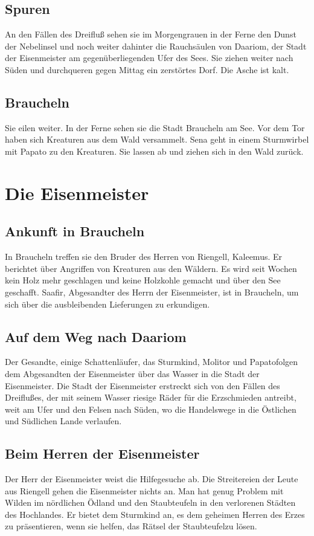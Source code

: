 \documentclass[12pt,a4paper,onecolumn,oneside,ngerman]{book}
\newcommand{\Molitor}{Molitor}
\newcommand{\Sena}{Sena}
\newcommand{\Sturmkind}{Sturmkind}
\newcommand{\Papato}{Papato}
\newcommand{\Schattenlaufer}{Schattenläufer}
\newcommand{\Rhingell}{Riengell}
\newcommand{\Kalemus}{Kaleemus}
\newcommand{\Dreifluss}{Dreifluß}
\newcommand{\Braucheln}{Braucheln}
\newcommand{\Eisenmeister}{Eisenmeister}
\newcommand{\Dariom}{Daariom}
\newcommand{\Safir}{Saafir}
\newcommand{\Staubteufel}{Staubteufel}
\begin{document}
\chapter{Spuren}
An den Fällen des {\Dreifluss} sehen sie im Morgengrauen in der Ferne den Dunst der Nebelinsel und noch weiter dahinter die Rauchsäulen von {\Dariom}, der Stadt der {\Eisenmeister} am gegenüberliegenden Ufer des Sees.\linebreak
Sie ziehen weiter nach Süden und durchqueren gegen Mittag ein zerstörtes Dorf. Die Asche ist kalt.

\chapter{\Braucheln}
Sie eilen weiter. In der Ferne sehen sie die Stadt {\Braucheln} am See. Vor dem Tor haben sich Kreaturen aus dem Wald versammelt. {\Sena} geht in einem Sturmwirbel mit {\Papato} zu den Kreaturen. Sie lassen ab und ziehen sich in den Wald zurück.

\part{Die {\Eisenmeister}}
\chapter{Ankunft in {\Braucheln}}
In {\Braucheln} treffen sie den Bruder des Herren von {\Rhingell}, {\Kalemus}. Er berichtet über Angriffen von Kreaturen aus den Wäldern. Es wird seit Wochen kein Holz mehr geschlagen und keine Holzkohle gemacht und über den See geschafft. {\Safir}, Abgesandter des Herrn der {\Eisenmeister}, ist in {\Braucheln}, um sich über die ausbleibenden Lieferungen zu erkundigen.

\chapter{Auf dem Weg nach \Dariom}
Der Gesandte, einige {\Schattenlaufer}, das {\Sturmkind}, {\Molitor} und \Papato folgen dem Abgesandten der {\Eisenmeister} über das Wasser in die Stadt der {\Eisenmeister}.\linebreak
Die Stadt der {\Eisenmeister} erstreckt sich von den Fällen des {\Dreifluss}es, der mit seinem Wasser riesige Räder für die Erzschmieden antreibt, weit am Ufer und den Felsen nach Süden, wo die Handelswege in die Östlichen und Südlichen Lande verlaufen.

\chapter{Beim Herren der {\Eisenmeister}}
Der Herr der {\Eisenmeister} weist die Hilfegesuche ab. Die Streitereien der Leute aus {\Rhingell}  gehen die {\Eisenmeister} nichts an. Man hat genug Problem mit Wilden im nördlichen Ödland und den {\Staubteufel}n in den verlorenen Städten des Hochlandes.\linebreak 
Er bietet dem {\Sturmkind} an, es dem geheimen Herren des Erzes zu präsentieren, wenn sie helfen, das Rätsel der \Staubteufel zu lösen.
\end{document}

